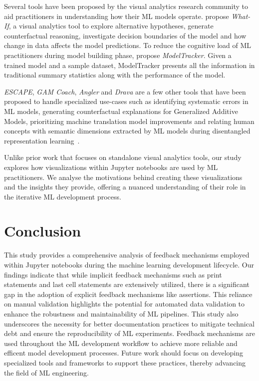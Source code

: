 \documentclass[smallextended]{svjour3}       %
\begin{document}
Several tools have been proposed by the visual analytics research community to aid practitioners in understanding how their ML models operate. \citet{wexler2019what-if} propose \textit{What-If}, a visual analytics tool to explore alternative hypotheses, generate counterfactual reasoning, investigate decision boundaries of the model and how change in data affects the model predictions. To reduce the cognitive load of ML practitioners during model building phase, \citet{amershi2019software} propose \textit{ModelTracker}. Given a trained model and a sample dataset, ModelTracker presents all the information in traditional summary statistics along with the performance of the model.

\textit{ESCAPE}, \textit{GAM Coach}, \textit{Angler} and \textit{Drava} are a few other tools that have been proposed to handle specialized use-cases such as identifying systematic errors in ML models, generating counterfactual explanations for Generalized Additive Models, prioritizing machine translation model improvements and relating human concepts with semantic dimensions extracted by ML models during disentangled representation learning~\citep{ahn2023escape,wang2023gam,robertson2023angler,wang2023drava}.

Unlike prior work that focuses on standalone visual analytics tools, our study explores how visualizations within Jupyter notebooks are used by ML practitioners. We analyse the motivations behind creating these visualizations and the insights they provide, offering a nuanced understanding of their role in the iterative ML development process.

\section{Conclusion}

This study provides a comprehensive analysis of feedback mechanisms employed within Jupyter notebooks during the machine learning development lifecycle. Our findings indicate that while implicit feedback mechanisms such as print statements and last cell statements are extensively utilized, there is a significant gap in the adoption of explicit feedback mechanisms like assertions. This reliance on manual validation highlights the potential for automated data validation to enhance the robustness and maintainability of ML pipelines. This study also underscores the necessity for better documentation practices to mitigate technical debt and ensure the reproducibility of ML experiments. Feedback mechanisms are used throughout the ML development workflow to achieve more reliable and efficent model development processes. Future work should focus on developing specialized tools and frameworks to support these practices, thereby advancing the field of ML engineering.
\end{document}
